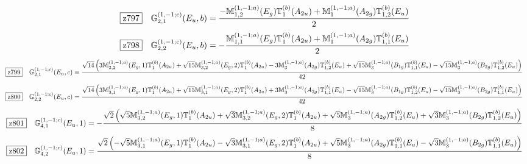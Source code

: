 \documentclass[fleqn,10pt,landscape]{jsarticle}
\begin{document}
\begin{dmath*}
\hspace*{3mm}\fbox{z797}\quad \mathbb{G}_{2,1}^{(1,-1;c)}(E_{u},b)=\frac{- \mathbb{M}_{1,2}^{(1,-1;a)}(E_{g}) \mathbb{T}_{1}^{(b)}(A_{2u}) + \mathbb{M}_{1}^{(1,-1;a)}(A_{2g}) \mathbb{T}_{1,2}^{(b)}(E_{u})}{2}
\end{dmath*}
\begin{dmath*}
\hspace*{3mm}\fbox{z798}\quad \mathbb{G}_{2,2}^{(1,-1;c)}(E_{u},b)=- \frac{\mathbb{M}_{1,1}^{(1,-1;a)}(E_{g}) \mathbb{T}_{1}^{(b)}(A_{2u}) + \mathbb{M}_{1}^{(1,-1;a)}(A_{2g}) \mathbb{T}_{1,1}^{(b)}(E_{u})}{2}
\end{dmath*}
\begin{dmath*}
\hspace*{3mm}\fbox{z799}\quad \mathbb{G}_{2,1}^{(1,-1;c)}(E_{u},c)=\frac{\sqrt{14} \left(3 \mathbb{M}_{3,2}^{(1,-1;a)}(E_{g},1) \mathbb{T}_{1}^{(b)}(A_{2u}) + \sqrt{15} \mathbb{M}_{3,2}^{(1,-1;a)}(E_{g},2) \mathbb{T}_{1}^{(b)}(A_{2u}) - 3 \mathbb{M}_{3}^{(1,-1;a)}(A_{2g}) \mathbb{T}_{1,2}^{(b)}(E_{u}) + \sqrt{15} \mathbb{M}_{3}^{(1,-1;a)}(B_{1g}) \mathbb{T}_{1,1}^{(b)}(E_{u}) - \sqrt{15} \mathbb{M}_{3}^{(1,-1;a)}(B_{2g}) \mathbb{T}_{1,2}^{(b)}(E_{u})\right)}{42}
\end{dmath*}
\begin{dmath*}
\hspace*{3mm}\fbox{z800}\quad \mathbb{G}_{2,2}^{(1,-1;c)}(E_{u},c)=\frac{\sqrt{14} \left(3 \mathbb{M}_{3,1}^{(1,-1;a)}(E_{g},1) \mathbb{T}_{1}^{(b)}(A_{2u}) + \sqrt{15} \mathbb{M}_{3,1}^{(1,-1;a)}(E_{g},2) \mathbb{T}_{1}^{(b)}(A_{2u}) + 3 \mathbb{M}_{3}^{(1,-1;a)}(A_{2g}) \mathbb{T}_{1,1}^{(b)}(E_{u}) - \sqrt{15} \mathbb{M}_{3}^{(1,-1;a)}(B_{1g}) \mathbb{T}_{1,2}^{(b)}(E_{u}) - \sqrt{15} \mathbb{M}_{3}^{(1,-1;a)}(B_{2g}) \mathbb{T}_{1,1}^{(b)}(E_{u})\right)}{42}
\end{dmath*}
\begin{dmath*}
\hspace*{3mm}\fbox{z801}\quad \mathbb{G}_{4,1}^{(1,-1;c)}(E_{u},1)=- \frac{\sqrt{2} \left(\sqrt{5} \mathbb{M}_{3,2}^{(1,-1;a)}(E_{g},1) \mathbb{T}_{1}^{(b)}(A_{2u}) + \sqrt{3} \mathbb{M}_{3,2}^{(1,-1;a)}(E_{g},2) \mathbb{T}_{1}^{(b)}(A_{2u}) + \sqrt{5} \mathbb{M}_{3}^{(1,-1;a)}(A_{2g}) \mathbb{T}_{1,2}^{(b)}(E_{u}) + \sqrt{3} \mathbb{M}_{3}^{(1,-1;a)}(B_{2g}) \mathbb{T}_{1,2}^{(b)}(E_{u})\right)}{8}
\end{dmath*}
\begin{dmath*}
\hspace*{3mm}\fbox{z802}\quad \mathbb{G}_{4,2}^{(1,-1;c)}(E_{u},1)=\frac{\sqrt{2} \left(- \sqrt{5} \mathbb{M}_{3,1}^{(1,-1;a)}(E_{g},1) \mathbb{T}_{1}^{(b)}(A_{2u}) - \sqrt{3} \mathbb{M}_{3,1}^{(1,-1;a)}(E_{g},2) \mathbb{T}_{1}^{(b)}(A_{2u}) + \sqrt{5} \mathbb{M}_{3}^{(1,-1;a)}(A_{2g}) \mathbb{T}_{1,1}^{(b)}(E_{u}) - \sqrt{3} \mathbb{M}_{3}^{(1,-1;a)}(B_{2g}) \mathbb{T}_{1,1}^{(b)}(E_{u})\right)}{8}
\end{dmath*}
\end{document}
